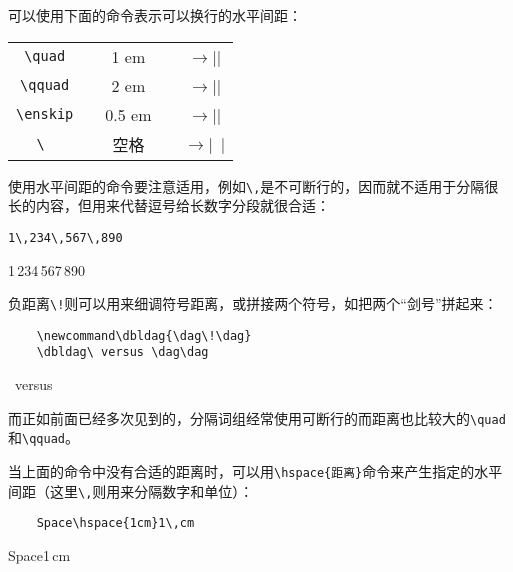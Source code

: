 可以使用下面的命令表示可以换行的水平间距：
\begin{table}[H]
    \centering
    \begin{tabular}{ccccc}
    \verb|\quad| && 1 em && $\longrightarrow$\negthinspace|\quad| \\
    \verb|\qquad|  && 2 em && $\longrightarrow$\negthinspace|\qquad| \\
    \verb|\enskip|  && 0.5 em && $\longrightarrow$\negthinspace|\enskip| \\
    \verb*|\ | &&  空格 && $\longrightarrow$\negthinspace|\ | \\
    \end{tabular}
\end{table}

使用水平间距的命令要注意适用，例如\verb|\,|是不可断行的，因而就不适用于分隔很长的内容，但用来代替逗号给长数字分段就很合适：

\begin{minipage}[t]{0.45\textwidth}
\begin{lstlisting}
1\,234\,567\,890
\end{lstlisting}
\end{minipage}
\hfill
\begin{minipage}[t]{0.45\textwidth}
    1\,234\,567\,890
\end{minipage}

负距离\verb|\!|则可以用来细调符号距离，或拼接两个符号，如把两个“剑号”拼起来：

\begin{minipage}[t]{0.45\textwidth}
\begin{lstlisting}
    \newcommand\dbldag{\dag\!\dag}
    \dbldag\ versus \dag\dag
\end{lstlisting}
\end{minipage}
\hfill
\begin{minipage}[t]{0.45\textwidth}
    \newcommand\dbldag{\dag\!\dag}
    \dbldag\ versus \dag\dag
\end{minipage}

而正如前面已经多次见到的，分隔词组经常使用可断行的而距离也比较大的\verb|\quad|和\verb|\qquad|。

当上面的命令中没有合适的距离时，可以用\verb|\hspace{距离}|命令来产生指定的水平间距（这里\verb|\,|则用来分隔数字和单位）：

\begin{minipage}[t]{0.45\textwidth}
\begin{lstlisting}
    Space\hspace{1cm}1\,cm
\end{lstlisting}
\end{minipage}
\hfill
\begin{minipage}[t]{0.45\textwidth}
    Space\hspace{1cm}1\,cm
\end{minipage}

